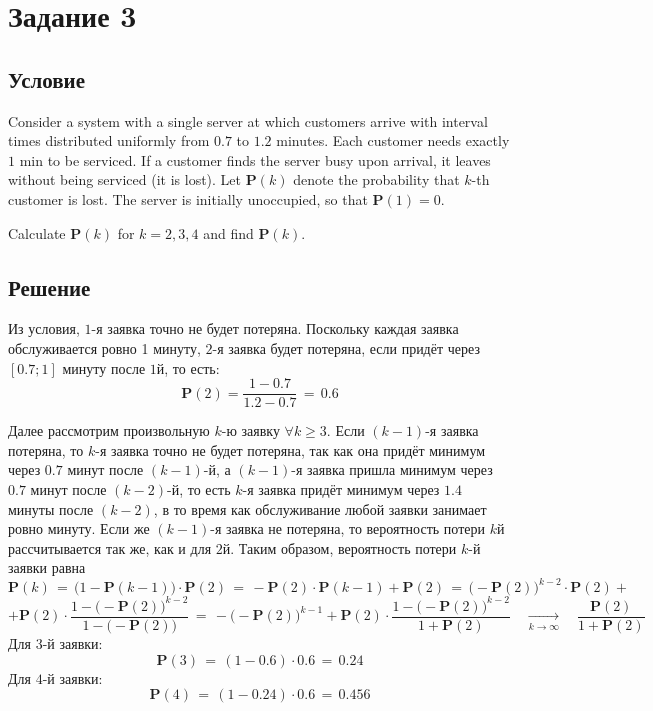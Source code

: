 \documentclass{article}
\begin{document}
\section*{Задание 3}
\subsection*{Условие}
Consider a system with a single server at which customers arrive with interval times distributed uniformly from $ 0.7 $ to $ 1.2 $ minutes. Each customer needs exactly $ 1 $ min to be serviced. If a customer finds the server busy upon arrival, it leaves without being serviced (it is lost). Let $ \mathbf{P} (k) $ denote the probability that $ k $-th customer is lost. The server is initially unoccupied, so that $ \mathbf{P} (1) \! = \! 0 $.\par
Calculate $ \mathbf{P} (k) $ for $ k \! = \! 2,3,4 $ and find $ \mathbf{P} (k) $.
\subsection*{Решение}
Из условия, $ 1 $-я заявка точно не будет потеряна. Поскольку каждая заявка обслуживается ровно 1 минуту, $ 2 $-я заявка будет потеряна, если придёт через $ [0.7;1] $ минуту после $ 1 $й, то есть:
\[ \mathbf{P} (2) \! = \! \dfrac{1 \! - \! 0.7}{1.2 \! - \! 0.7} \, = \, 0.6 \]\par
Далее рассмотрим произвольную $ k $-ю заявку $ \forall k \! \geqslant \! 3 $. Если $ (k \! - \! 1) $-я заявка потеряна, то $ k $-я заявка точно не будет потеряна, так как она придёт минимум через $ 0.7 $ минут после $ (k \! - \! 1) $-й, а $ (k \! - \! 1) $-я заявка пришла минимум через $ 0.7 $ минут после $ (k \! - \! 2) $-й, то есть $ k $-я заявка придёт минимум через $ 1.4 $ минуты после $ (k \! - \! 2) $, в то время как обслуживание любой заявки занимает ровно минуту. Если же $ (k \! - \! 1) $-я заявка не потеряна, то вероятность потери $ k $й рассчитывается так же, как и для $ 2 $й. Таким образом, вероятность потери $ k $-й заявки равна
\[ \mathbf{P}(k) \, = \, \Big( 1 \! - \! \mathbf{P}(k \! - \! 1) \Big) \! \cdot \! \mathbf{P}(2) \, = \, -\mathbf{P}(2) \! \cdot \! \mathbf{P}(k \! - \! 1) \! + \! \mathbf{P}(2) \, = \, {\Big( -\mathbf{P}(2) \Big)}^{k-2} \! \cdot \! \mathbf{P}(2) + \]
\[ + \mathbf{P}(2) \! \cdot \! \dfrac{1 \! - \! {\Big( -\mathbf{P}(2) \Big)}^{k-2}}{1 \! - \! \Big( -\mathbf{P}(2) \Big)} \, = \, -{\Big( -\mathbf{P}(2) \Big)}^{k-1} \! + \! \mathbf{P}(2) \! \cdot \! \dfrac{1 \! - \! {\Big( -\mathbf{P}(2) \Big)}^{k-2}}{1 \! + \! \mathbf{P}(2)} \quad \underset{k \rightarrow \infty}{\longrightarrow} \quad \dfrac{\mathbf{P}(2)}{1 \! + \! \mathbf{P}(2)} \]
Для $ 3 $-й заявки:
\[ \mathbf{P}(3) \, = \, (1 \! - \! 0.6) \! \cdot \! 0.6 \, = \, 0.24 \]
Для $ 4 $-й заявки:
\[ \mathbf{P}(4) \, = \, (1 \! - \! 0.24) \! \cdot \! 0.6 \, = \, 0.456 \]
\end{document}
